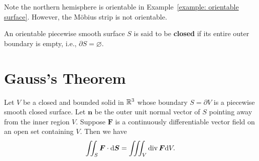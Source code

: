 \begin{exampleenv}
    Note the northern hemisphere is orientable in Example~\ref{example: orientable surface}. However, the Möbius strip is not orientable.
\end{exampleenv}
\begin{definitionenv}
    An orientable piecewise smooth surface $S$ is said to be \textbf{closed} if its entire outer boundary is empty, i.e., $\partial S = \varnothing$.
\end{definitionenv}

\section{Gauss's Theorem}
\begin{theoremenv}
    Let $V$ be a closed and bounded solid in $\mathbb{R}^3$ whose boundary $S=\partial V$ is a piecewise smooth closed surface. Let $\bm n$ be the outer unit normal vector of $S$ pointing away from the inner region $V$. Suppose $\bm F$ is a continuously differentiable vector field on an open set containing $V$. Then we have
    $$ \iint_S \bm F \cdot \dd \bm S = \iiint_V \operatorname{\mathrm{div}} \bm F \dd V. $$
\end{theoremenv}
